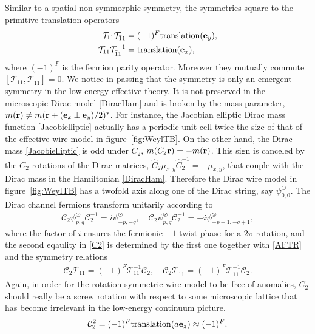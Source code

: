 Similar to a spatial non-symmorphic symmetry, the \AFTR symmetries square to the primitive translation operators \begin{align}\mathcal{T}_{11}\mathcal{T}_{\bar{1}1}&=(-1)^F\mbox{translation}({\bf e}_y),\nonumber\\\mathcal{T}_{11}\mathcal{T}_{\bar{1}1}^{-1}&=\mbox{translation}({\bf e}_x),\label{AFTRalg}\end{align} where $(-1)^F$ is the fermion parity operator. Moreover they mutually commute $[\mathcal{T}_{11},\mathcal{T}_{\bar{1}1}]=0$. We notice in passing that the \AFTR symmetry is only an emergent symmetry in the low-energy effective theory. It is not preserved in the microscopic Dirac model \eqref{DiracHam} and is broken by the mass parameter, $m({\bf r})\neq m({\bf r}+({\bf e}_x\pm{\bf e}_y)/2)^\ast$. For instance, the Jacobian elliptic Dirac mass function \eqref{Jacobielliptic} actually has a periodic unit cell twice the size of that of the effective wire model in figure~\ref{fig:WeylTB}. On the other hand, the Dirac mass \eqref{Jacobielliptic} is odd under $C_2$, $m(C_2{\bf r})=-m({\bf r})$. This sign is canceled by the $C_2$ rotations of the Dirac matrices, $\hat{C}_2\mu_{x,y}\hat{C}_2^{-1}=-\mu_{x,y}$, that couple with the Dirac mass in the Hamiltonian \eqref{DiracHam}. Therefore the Dirac wire model in figure~\ref{fig:WeylTB} has a twofold axis along one of the Dirac string, say $\psi^\odot_{0,0}$. The Dirac channel fermions transform unitarily according to \begin{align}\mathcal{C}_2\psi^\odot_{p,q}\mathcal{C}_2^{-1}=i\psi^\odot_{-p,-q},\quad\mathcal{C}_2\psi^\otimes_{p,q}\mathcal{C}_2^{-1}=-i\psi^\otimes_{-p+1,-q+1},\label{C2}\end{align} where the factor of $i$ ensures the fermionic $-1$ twist phase for a $2\pi$ rotation, and the second eqaulity in \eqref{C2} is determined by the first one together with \eqref{AFTR} and the symmetry relations \begin{gather}\mathcal{C}_2\mathcal{T}_{11}=(-1)^F\mathcal{T}_{11}^{-1}\mathcal{C}_2,\quad\mathcal{C}_2\mathcal{T}_{\bar{1}1}=(-1)^F\mathcal{T}_{\bar{1}1}^{-1}\mathcal{C}_2.\label{C2Trelation}\end{gather} Again, in order for the rotation symmetric wire model to be free of anomalies, $C_2$ should really be a screw rotation with respect to some microscopic lattice that has become irrelevant in the low-energy continuum picture. \begin{align}\mathcal{C}_2^2=(-1)^F\mathrm{translation}(a{\bf e}_z)\approx(-1)^F.\label{C2square}\end{align}


